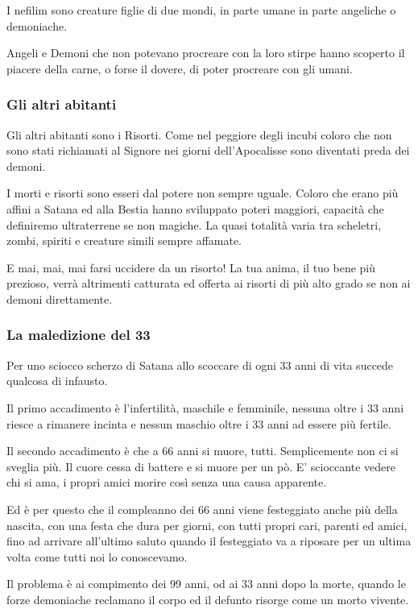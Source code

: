 \documentclass[a4paper,twoside,openany]{book}
\begin{document}
\begin{multicols}{2}
I nefilim sono creature figlie di due mondi, in parte umane in parte angeliche o demoniache.

Angeli e Demoni che non potevano procreare con la loro stirpe hanno scoperto il piacere della carne, o forse il dovere, di poter procreare con gli umani.

\subsubsection{Gli altri abitanti}

Gli altri abitanti sono i Risorti. Come nel peggiore degli incubi coloro che non sono stati richiamati al Signore nei giorni dell'Apocalisse sono diventati preda dei demoni.

I morti e risorti sono esseri dal potere non sempre uguale. Coloro che erano più affini a Satana ed alla Bestia hanno sviluppato poteri maggiori, capacità che definiremo ultraterrene se non magiche. La quasi totalità varia tra scheletri, zombi, spiriti e creature simili sempre affamate.

E mai, mai, mai farsi uccidere da un risorto! La tua anima, il tuo bene più prezioso, verrà altrimenti catturata ed offerta ai risorti di più alto grado se non ai demoni direttamente.

\subsubsection{La maledizione del 33}

Per uno sciocco scherzo di Satana allo scoccare di ogni 33 anni di vita succede qualcosa di infausto.

Il primo accadimento è l'infertilità, maschile e femminile, nessuna oltre i 33 anni riesce a rimanere incinta e nessun maschio oltre i 33 anni ad essere più fertile.

Il secondo accadimento è che a 66 anni si muore, tutti. Semplicemente non ci si sveglia più. Il cuore cessa di battere e si muore per un pò.
E' scioccante vedere chi si ama, i propri amici morire così senza una causa apparente.

Ed è per questo che il compleanno dei 66 anni viene festeggiato anche più della nascita, con una festa che dura per giorni, con tutti propri cari, parenti ed amici, fino ad arrivare all'ultimo saluto quando il festeggiato va a riposare per un ultima volta come tutti noi lo conoscevamo.

Il problema è ai compimento dei 99 anni, od ai 33 anni dopo la morte, quando le forze demoniache reclamano il corpo ed il defunto risorge come un morto vivente.


\end{multicols}
\end{document}

